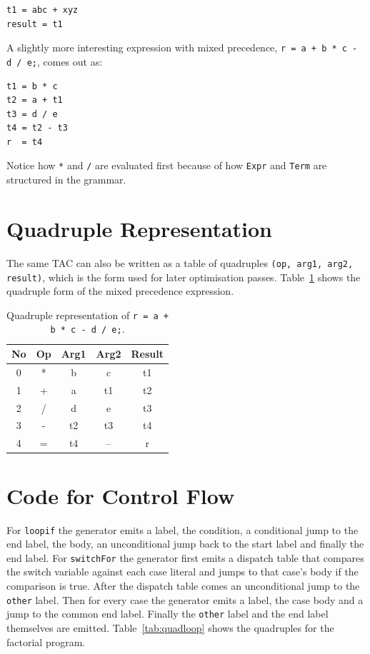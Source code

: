 \documentclass[12pt,a4paper]{report}
\begin{document}
\begin{verbatim}
t1 = abc + xyz
result = t1
\end{verbatim}

A slightly more interesting expression with mixed precedence, \texttt{r = a + b * c - d / e;}, comes out as:

\begin{verbatim}
t1 = b * c
t2 = a + t1
t3 = d / e
t4 = t2 - t3
r  = t4
\end{verbatim}

Notice how \texttt{*} and \texttt{/} are evaluated first because of how \texttt{Expr} and \texttt{Term} are structured in the grammar.

\section{Quadruple Representation}

The same TAC can also be written as a table of quadruples \texttt{(op, arg1, arg2, result)}, which is the form used for later optimisation passes. Table~\ref{tab:quad} shows the quadruple form of the mixed precedence expression.

\begin{table}[H]
\centering
\begin{tabular}{|c|c|c|c|c|}
\hline
\textbf{No} & \textbf{Op} & \textbf{Arg1} & \textbf{Arg2} & \textbf{Result} \\
\hline
0 & * & b  & c  & t1 \\
1 & + & a  & t1 & t2 \\
2 & / & d  & e  & t3 \\
3 & - & t2 & t3 & t4 \\
4 & = & t4 & -- & r  \\
\hline
\end{tabular}
\caption{Quadruple representation of \texttt{r = a + b * c - d / e;}.}
\label{tab:quad}
\end{table}

\section{Code for Control Flow}

For \texttt{loopif} the generator emits a label, the condition, a conditional jump to the end label, the body, an unconditional jump back to the start label and finally the end label. For \texttt{switchFor} the generator first emits a dispatch table that compares the switch variable against each case literal and jumps to that case's body if the comparison is true. After the dispatch table comes an unconditional jump to the \texttt{other} label. Then for every case the generator emits a label, the case body and a jump to the common end label. Finally the \texttt{other} label and the end label themselves are emitted. Table~\ref{tab:quadloop} shows the quadruples for the factorial program.
\end{document}

